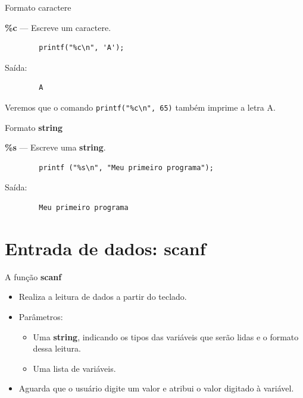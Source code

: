 \documentclass[handout]{beamer}
\begin{document}
\begin{frame}[fragile]{Formato caractere}

    \textbf{\%c} --- Escreve um caractere.

    \begin{verbatim}
        printf("%c\n", 'A');
    \end{verbatim}
    Saída:
    \begin{verbatim}
        A
    \end{verbatim}

    Veremos que o comando \texttt{printf("\%c\textbackslash n", 65)} também imprime a letra A.
\end{frame}

\begin{frame}[fragile]{Formato {\bf string}}

    \textbf{\%s} --- Escreve uma {\bf string}.

    \begin{verbatim}
        printf ("%s\n", "Meu primeiro programa");
    \end{verbatim}
    Saída:
    \begin{verbatim}
        Meu primeiro programa
    \end{verbatim}
\end{frame}



\section{Entrada de dados: scanf}

\begin{frame}[fragile]{A função {\bf scanf}}

    \begin{itemize}[<+->]
        \item Realiza a leitura de dados a partir do teclado.
        \item Parâmetros:
        \begin{itemize}
            \item Uma {\bf string}, indicando os tipos das variáveis que serão lidas e o formato dessa leitura.
            \item Uma lista de variáveis.
        \end{itemize}
        \item Aguarda que o usuário digite um valor e atribui o valor digitado à variável.
    \end{itemize}
\end{frame}
\end{document}

